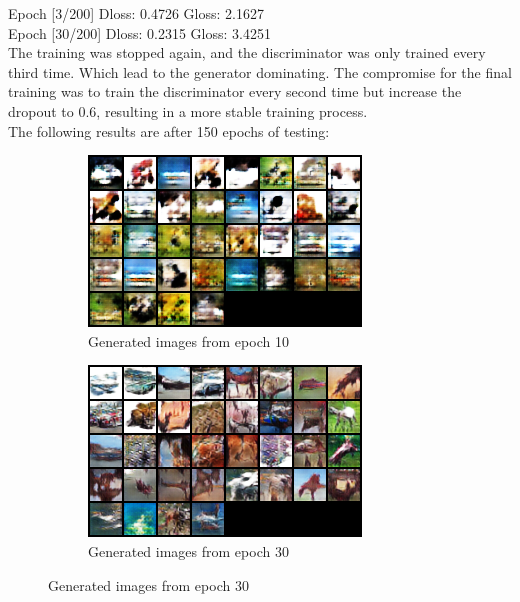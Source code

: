 \newline 
Epoch [3/200] Dloss: 0.4726 Gloss: 2.1627\\
Epoch [30/200] Dloss: 0.2315 Gloss: 3.4251\\
\newline 
The training was stopped again, and the discriminator was only trained every third time. Which lead to the generator dominating. The compromise for the final training was to train the discriminator every second time but increase the dropout to 0.6, resulting in a more stable training process.\\
The following results are after 150 epochs of testing:

\begin{figure}[H]
    \centering
    \begin{subfigure}[t]{0.48\textwidth}
        \centering
        \includegraphics[width=\textwidth]{images/ex_2/try_2/epoch_10}
        \caption{Generated images from epoch 10}
    \end{subfigure}
    \begin{subfigure}[t]{0.48\textwidth}
        \centering
        \includegraphics[width=\textwidth]{images/ex_2/try_2/epoch_30}
        \caption{Generated images from epoch 30}
    \end{subfigure}
    \hfill
\end{figure}


